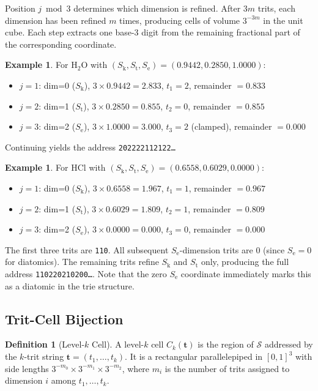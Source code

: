 \documentclass[11pt,a4paper]{article}
\theoremstyle{definition}
\newtheorem{definition}[theorem]{Definition}
\newtheorem{example}[theorem]{Example}
\theoremstyle{remark}
\newcommand{\Sk}{S_{\mathrm{k}}}
\newcommand{\St}{S_{\mathrm{t}}}
\newcommand{\Se}{S_{\mathrm{e}}}
\newcommand{\Sspace}{\mathcal{S}}
\begin{document}
Position $j \bmod 3$ determines which dimension is refined. After $3m$ trits, each dimension has been refined $m$ times, producing cells of volume $3^{-3m}$ in the unit cube. Each step extracts one base-3 digit from the remaining fractional part of the corresponding coordinate.

\begin{example}
For H$_2$O with $(\Sk, \St, \Se) = (0.9442, 0.2850, 1.0000)$:
\begin{itemize}[nosep]
\item $j=1$: dim=0 ($\Sk$), $3 \times 0.9442 = 2.833$, $t_1 = 2$, remainder $= 0.833$
\item $j=2$: dim=1 ($\St$), $3 \times 0.2850 = 0.855$, $t_2 = 0$, remainder $= 0.855$
\item $j=3$: dim=2 ($\Se$), $3 \times 1.0000 = 3.000$, $t_3 = 2$ (clamped), remainder $= 0.000$
\end{itemize}
Continuing yields the address \texttt{202222112122\ldots}
\end{example}

\begin{example}
For HCl with $(\Sk, \St, \Se) = (0.6558, 0.6029, 0.0000)$:
\begin{itemize}[nosep]
\item $j=1$: dim=0 ($\Sk$), $3 \times 0.6558 = 1.967$, $t_1 = 1$, remainder $= 0.967$
\item $j=2$: dim=1 ($\St$), $3 \times 0.6029 = 1.809$, $t_2 = 1$, remainder $= 0.809$
\item $j=3$: dim=2 ($\Se$), $3 \times 0.0000 = 0.000$, $t_3 = 0$, remainder $= 0.000$
\end{itemize}
The first three trits are \texttt{110}. All subsequent $\Se$-dimension trits are 0 (since $\Se = 0$ for diatomics). The remaining trits refine $\Sk$ and $\St$ only, producing the full address \texttt{110220210200\ldots}. Note that the zero $\Se$ coordinate immediately marks this as a diatomic in the trie structure.
\end{example}

\subsection{Trit-Cell Bijection}

\begin{definition}[Level-$k$ Cell]
\label{def:cell}
A level-$k$ cell $C_k(\mathbf{t})$ is the region of $\Sspace$ addressed by the $k$-trit string $\mathbf{t} = (t_1, \ldots, t_k)$. It is a rectangular parallelepiped in $[0,1]^3$ with side lengths $3^{-m_0} \times 3^{-m_1} \times 3^{-m_2}$, where $m_i$ is the number of trits assigned to dimension $i$ among $t_1, \ldots, t_k$.
\end{definition}
\end{document}
